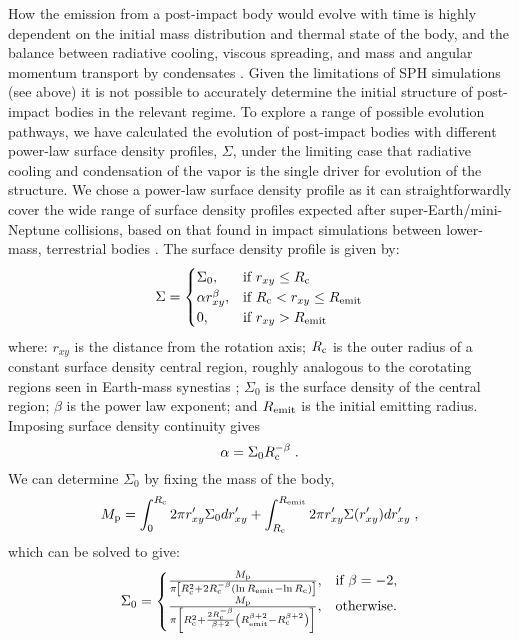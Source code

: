 \documentclass[sn-nature,oneside]{sn-jnl}%
\begin{document}
How the emission from a post-impact body would evolve with time is highly dependent on the initial mass distribution and thermal state of the body, and the balance between radiative cooling, viscous spreading, and mass and angular momentum transport by condensates \cite{Lock2017,Lock18,Lock2020}. 
%
Given the limitations of SPH simulations (see above) it is not possible to accurately determine the initial structure of post-impact bodies in the relevant regime.
%
To explore a range of possible evolution pathways, we have calculated the evolution of post-impact bodies with different power-law surface density profiles, $\Sigma$, under the limiting case that radiative cooling and condensation of the vapor is the single driver for evolution of the structure. 
%
We chose a power-law surface density profile as it can straightforwardly cover the wide range of surface density profiles expected after super-Earth/mini-Neptune collisions, based on that found in impact simulations between lower-mass, terrestrial bodies \cite{Lock2017,Canup2001,Canup2012,Cuk2012,Rufu2017,Reufer2012}. 
%
The surface density profile is given by:
%
\begin{equation}
\Sigma=\begin{cases}
\Sigma_0, & \text{if } r_{xy}\leq R_{\rm c}\\
\alpha r_{xy}^{\beta}, & \text{if } R_{\rm c} < r_{xy}\leq R_{\rm emit}\\
0, & \text{if } r_{xy}> R_{\rm emit}
\end{cases}   
\label{eqn:sigma}
\end{equation}
%
where: $r_{xy}$ is the distance from the rotation axis; $R_{\rm c}$ is the outer radius of a constant surface density central region, roughly analogous to the corotating regions seen in Earth-mass synestias \cite{Lock2017,Lock18}; $\Sigma_0$ is the surface density of the central region; $\beta$ is the power law exponent; and $R_{\rm emit}$ is the initial emitting radius. Imposing surface density continuity gives
%
\begin{equation}
    \alpha=\Sigma_0 R_{\rm c}^{-\beta} \; .
\end{equation}
%
We can determine $\Sigma_0$ by fixing the mass of the body, 
%
\begin{equation}
    M_{\rm p} = \int_0^{R_{\rm c}}{2 \pi r'_{xy} \Sigma_0 dr'_{xy}} + \int_{R_{\rm c}}^{R_{\rm emit}}{2 \pi r'_{xy} \Sigma(r'_{xy}) dr'_{xy}} \; ,
\end{equation}
%
which can be solved to give:
%
\begin{equation}
\Sigma_0=\begin{cases}
\frac{M_{\rm p}}{\pi \left [R_{\rm c}^2 + 2 R_{\rm c}^{-\beta} \left ( \ln{R_{\rm emit}}-\ln{R_{\rm c}}\right ) \right ]}, & \text{if } \beta=-2,\\
\frac{M_{\rm p}}{\pi \left [R_{\rm c}^2 + \frac{2 R_{\rm c}^{-\beta}}{\beta+2} \left ( R_{\rm emit}^{\beta+2}-R_{\rm c}^{\beta+2}\right ) \right ]}, & \text{otherwise.} 
\end{cases}
\end{equation}
\end{document}
